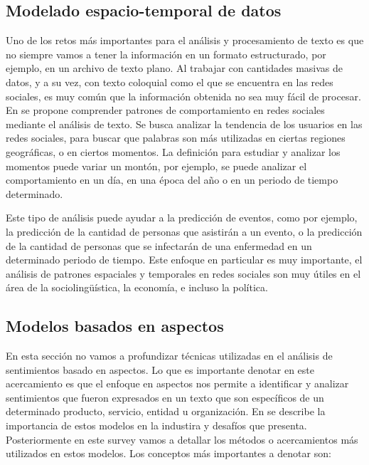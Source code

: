 \documentclass[12pt, conference]{IEEEtran}
\begin{document}
\subsection{Modelado espacio-temporal de datos}\label{subsec:Modelado}

Uno de los retos más importantes para el análisis y procesamiento de texto es que no siempre vamos a tener la información en un formato estructurado, por ejemplo, en un archivo de texto plano.
Al trabajar con cantidades masivas de datos, y a su vez, con texto coloquial como el que se encuentra en las redes sociales, es muy común que la información obtenida no sea muy fácil de procesar. 
En \cite{b19} se propone comprender patrones de comportamiento en redes sociales mediante el análisis de texto. Se busca analizar la tendencia de los usuarios en las redes sociales, para buscar que palabras son más utilizadas en ciertas regiones geográficas, o en ciertos momentos.
La definición para estudiar y analizar los momentos puede variar un montón, por ejemplo, se puede analizar el comportamiento en un día, en una época del año o en un periodo de tiempo determinado.

Este tipo de análisis puede ayudar a la predicción de eventos, como por ejemplo, la predicción de la cantidad de personas que asistirán a un evento, o la predicción de la cantidad de personas que se infectarán de una enfermedad en un determinado periodo de tiempo.
Este enfoque en particular es muy importante, el análisis de patrones espaciales y temporales en redes sociales son muy útiles en el área de la sociolingüística, la economía, e incluso la política.

\subsection{Modelos basados en aspectos}

En esta sección no vamos a profundizar técnicas utilizadas en el análisis de sentimientos basado en aspectos. Lo que es importante denotar en este acercamiento es que el enfoque en aspectos nos permite a identificar y analizar sentimientos que fueron expresados en un texto que son específicos de un determinado producto, servicio, entidad u organización.
En \cite{b21} se describe la importancia de estos modelos en la industira y desafíos que presenta. Posteriormente en este survey vamos a detallar los métodos o acercamientos más utilizados en estos modelos. Los conceptos más importantes a denotar son:
\end{document}
